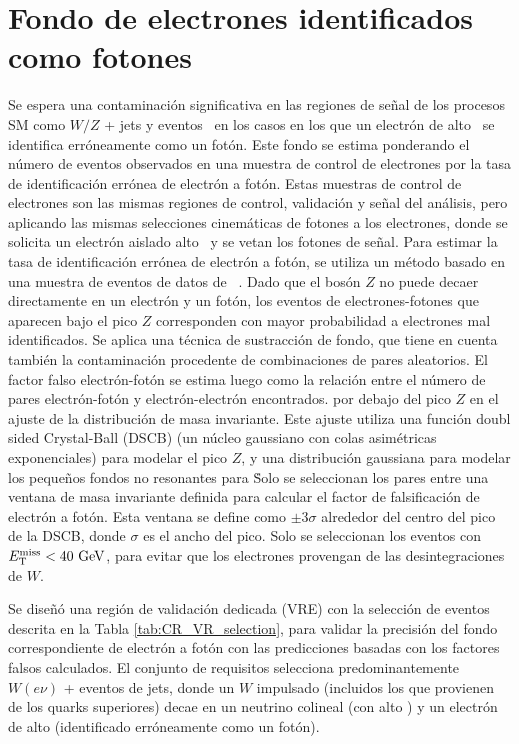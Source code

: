 \section{Fondo de electrones identificados como fotones}


Se espera una contaminación significativa en las regiones de señal de los procesos SM como $W/Z$ + jets y eventos \ttbar\ en los casos en los que un electrón de alto \pt\ se identifica erróneamente como un fotón.
Este fondo se estima ponderando el número de eventos observados en una muestra de control de electrones por la tasa de identificación errónea de electrón a fotón.
Estas muestras de control de electrones son las mismas regiones de control, validación y señal del análisis, pero aplicando las mismas selecciones cinemáticas de fotones a los electrones, donde se solicita un electrón aislado alto \pt\ y se vetan los fotones de señal.
Para estimar la tasa de identificación errónea de electrón a fotón, se utiliza un método basado en una muestra de eventos de datos de \zee\ \cite{ATLASCollaboration: 2016wlb, ATLAS: 2020uiq}. Dado que el bosón $Z$ no puede decaer directamente en un electrón y un fotón, los eventos de electrones-fotones que aparecen bajo el pico $Z$ corresponden con mayor probabilidad a
electrones mal identificados. Se aplica una técnica de sustracción de fondo, que tiene en cuenta también la
contaminación procedente de combinaciones de pares aleatorios. El factor falso electrón-fotón se estima luego como la relación entre el número de pares electrón-fotón y electrón-electrón encontrados.
por debajo del pico $Z$ en el ajuste de la distribución de masa invariante.
Este ajuste utiliza una función doubl sided Crystal-Ball (DSCB) (un núcleo gaussiano con colas asimétricas exponenciales) para modelar el pico $Z$, y una distribución gaussiana para modelar los pequeños fondos no resonantes para \zee\.
Solo se seleccionan los pares entre una ventana de masa invariante definida para calcular el factor de falsificación de electrón a fotón. Esta ventana se define como $\pm 3 \sigma$ alrededor del centro del pico de la DSCB, donde $\sigma$ es el ancho del pico.
Solo se seleccionan los eventos con $E_{\text{T}}^{\text{miss}}<40\ \text{GeV} $,
para evitar que los electrones provengan de las desintegraciones de $W$.

Se diseñó una región de validación dedicada (VRE) con la selección de eventos descrita en la Tabla
\ref{tab:CR_VR_selection}, para validar la precisión del fondo correspondiente de electrón a fotón
con las predicciones basadas con los factores falsos calculados. El conjunto de requisitos selecciona
predominantemente $W(e \nu)$ + eventos de jets, donde un $W$ impulsado (incluidos los que provienen de los quarks superiores) decae en un
neutrino colineal (con alto \met) y un electrón de alto \pt  (identificado erróneamente como un
fotón).

